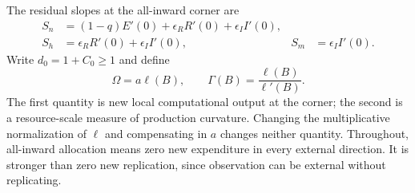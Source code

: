 The residual slopes at the all-inward corner are
\begin{align}
 S_n&=(1-q)E'(0)+\epsilon_RR'(0)+\epsilon_II'(0),\nonumber\\
 S_h&=\epsilon_RR'(0)+\epsilon_II'(0),&
 S_m&=\epsilon_II'(0).
 \label{eq:slopes}
\end{align}
Write $d_0=1+C_0\geq1$ and define
\begin{equation}
 \Omega=a\ell(B),\qquad
 \Gamma(B)=\frac{\ell(B)}{\ell'(B)}.
 \label{eq:omega-gamma}
\end{equation}
The first quantity is new local computational output at the corner;
the second is a resource-scale measure of production curvature.
Changing the multiplicative normalization of $\ell$ and compensating in
$a$ changes neither quantity. Throughout, all-inward allocation means
zero new expenditure in every external direction. It is stronger than
zero new replication, since observation can be external without
replicating.
